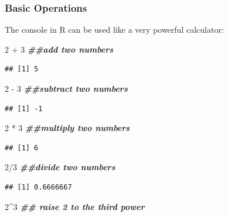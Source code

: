 \documentclass[
]{book}
\newenvironment{Shaded}{\begin{snugshade}}{\end{snugshade}}
\newcommand{\DecValTok}[1]{\textcolor[rgb]{0.00,0.00,0.81}{#1}}
\newcommand{\DocumentationTok}[1]{\textcolor[rgb]{0.56,0.35,0.01}{\textbf{\textit{#1}}}}
\newcommand{\SpecialCharTok}[1]{\textcolor[rgb]{0.00,0.00,0.00}{#1}}
\theoremstyle{definition}
\theoremstyle{definition}
\theoremstyle{definition}
\theoremstyle{definition}
\theoremstyle{remark}
\begin{document}
\hypertarget{basic-operations}{%
\subsubsection{Basic Operations}\label{basic-operations}}

The console in R can be used like a very powerful calculator:

\begin{Shaded}
\begin{Highlighting}[]
\DecValTok{2} \SpecialCharTok{+} \DecValTok{3}  \DocumentationTok{\#\#add two numbers}
\end{Highlighting}
\end{Shaded}

\begin{verbatim}
## [1] 5
\end{verbatim}

\begin{Shaded}
\begin{Highlighting}[]
\DecValTok{2} \SpecialCharTok{{-}} \DecValTok{3}  \DocumentationTok{\#\#subtract two numbers}
\end{Highlighting}
\end{Shaded}

\begin{verbatim}
## [1] -1
\end{verbatim}

\begin{Shaded}
\begin{Highlighting}[]
\DecValTok{2} \SpecialCharTok{*} \DecValTok{3}  \DocumentationTok{\#\#multiply two numbers}
\end{Highlighting}
\end{Shaded}

\begin{verbatim}
## [1] 6
\end{verbatim}

\begin{Shaded}
\begin{Highlighting}[]
\DecValTok{2}\SpecialCharTok{/}\DecValTok{3}  \DocumentationTok{\#\#divide two numbers}
\end{Highlighting}
\end{Shaded}

\begin{verbatim}
## [1] 0.6666667
\end{verbatim}

\begin{Shaded}
\begin{Highlighting}[]
\DecValTok{2}\SpecialCharTok{\^{}}\DecValTok{3}  \DocumentationTok{\#\# raise 2 to the third power}
\end{Highlighting}
\end{Shaded}
\end{document}
